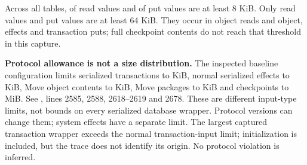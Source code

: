 Across all tables,  of  read values and  of  put values are at least 8 KiB. Only  read values and  put values are at least 64 KiB. They occur in object reads and object, effects and transaction puts; full checkpoint contents do not reach that threshold in this capture.

\textbf{Protocol allowance is not a size distribution.} The inspected baseline configuration limits serialized transactions to  KiB, normal serialized effects to  KiB, Move object contents to  KiB, Move packages to  KiB and checkpoints to  MiB. See , lines 2585, 2588, 2618--2619 and 2678. These are different input-type limits, not bounds on every serialized database wrapper. Protocol versions can change them; system effects have a separate limit. The largest captured transaction wrapper exceeds the normal transaction-input limit; initialization is included, but the trace does not identify its origin. No protocol violation is inferred.

